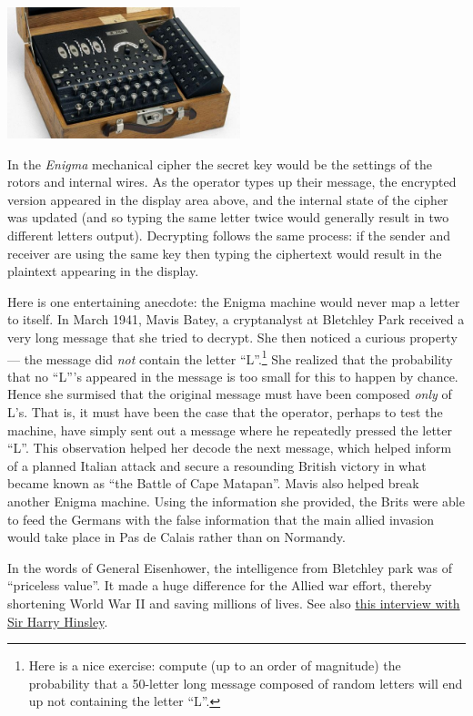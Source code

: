 \begin{marginfigure}
\centering
\includegraphics[width=\linewidth, height=1.5in, keepaspectratio]{../figure/enigma.jpg}
\caption{In the \emph{Enigma} mechanical cipher the secret key would be
the settings of the rotors and internal wires. As the operator types up
their message, the encrypted version appeared in the display area above,
and the internal state of the cipher was updated (and so typing the same
letter twice would generally result in two different letters output).
Decrypting follows the same process: if the sender and receiver are
using the same key then typing the ciphertext would result in the
plaintext appearing in the display.}
\label{enigmafig}
\end{marginfigure}

Here is one entertaining anecdote: the Enigma machine would never map a
letter to itself. In March 1941, Mavis Batey, a cryptanalyst at
Bletchley Park received a very long message that she tried to decrypt.
She then noticed a curious property--- the message did \emph{not}
contain the letter ``L''.\footnote{Here is a nice exercise: compute (up
  to an order of magnitude) the probability that a 50-letter long
  message composed of random letters will end up not containing the
  letter ``L''.} She realized that the probability that no ``L'''s
appeared in the message is too small for this to happen by chance. Hence
she surmised that the original message must have been composed
\emph{only} of L's. That is, it must have been the case that the
operator, perhaps to test the machine, have simply sent out a message
where he repeatedly pressed the letter ``L''. This observation helped
her decode the next message, which helped inform of a planned Italian
attack and secure a resounding British victory in what became known as
``the Battle of Cape Matapan''. Mavis also helped break another Enigma
machine. Using the information she provided, the Brits were able to feed
the Germans with the false information that the main allied invasion
would take place in Pas de Calais rather than on Normandy.

In the words of General Eisenhower, the intelligence from Bletchley park
was of ``priceless value''. It made a huge difference for the Allied war
effort, thereby shortening World War II and saving millions of lives.
See also \href{http://www.cix.co.uk/~klockstone/hinsley.htm}{this
interview with Sir Harry Hinsley}.

